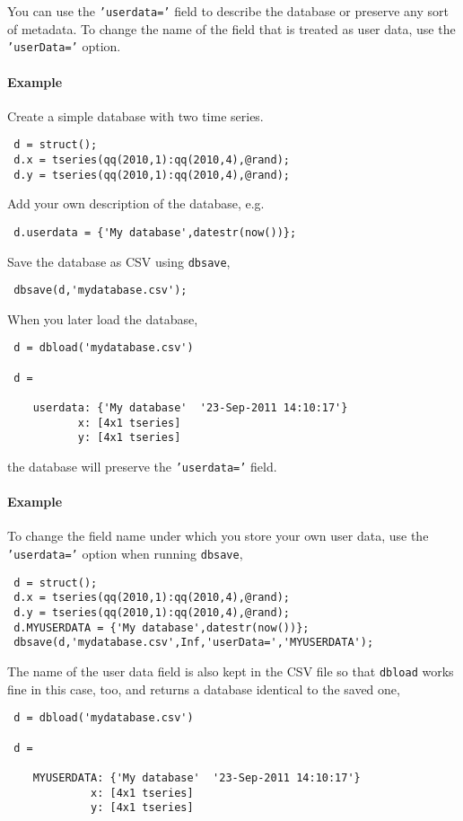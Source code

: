  You can use the \texttt{'userdata='} field to describe the database or
 preserve any sort of metadata. To change the name of the field that is
 treated as user data, use the \texttt{'userData='} option.
 
 \paragraph{Example}
 
 Create a simple database with two time series.
 
 \begin{verbatim}
 d = struct();
 d.x = tseries(qq(2010,1):qq(2010,4),@rand);
 d.y = tseries(qq(2010,1):qq(2010,4),@rand);
 \end{verbatim}
 
 Add your own description of the database, e.g.
 
 \begin{verbatim}
 d.userdata = {'My database',datestr(now())};
 \end{verbatim}
 
 Save the database as CSV using \texttt{dbsave},
 
 \begin{verbatim}
 dbsave(d,'mydatabase.csv');
 \end{verbatim}
 
 When you later load the database,
 
 \begin{verbatim}
 d = dbload('mydatabase.csv')
 
 d = 
 
    userdata: {'My database'  '23-Sep-2011 14:10:17'}
           x: [4x1 tseries]
           y: [4x1 tseries]
 \end{verbatim}
 
 the database will preserve the \texttt{'userdata='} field.
 
 \paragraph{Example}
 
 To change the field name under which you store your own user data, use
 the \texttt{'userdata='} option when running \texttt{dbsave},
 
 \begin{verbatim}
 d = struct();
 d.x = tseries(qq(2010,1):qq(2010,4),@rand);
 d.y = tseries(qq(2010,1):qq(2010,4),@rand);
 d.MYUSERDATA = {'My database',datestr(now())};
 dbsave(d,'mydatabase.csv',Inf,'userData=','MYUSERDATA');
 \end{verbatim}
 
 The name of the user data field is also kept in the CSV file so that
 \texttt{dbload} works fine in this case, too, and returns a database
 identical to the saved one,
 
 \begin{verbatim}
 d = dbload('mydatabase.csv')
 
 d = 
 
    MYUSERDATA: {'My database'  '23-Sep-2011 14:10:17'}
             x: [4x1 tseries]
             y: [4x1 tseries]
 \end{verbatim}


